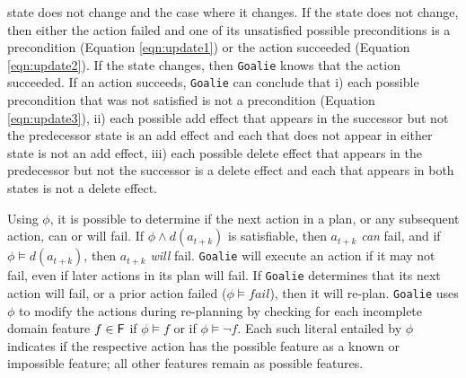 \documentclass[letterpaper]{article}
\def\FFRISKY{{\tt DeFAULT}}
\def\goalie{{\tt Goalie}}
\begin{document}
state does not change and the case where it changes.  If the state does not
change, then either the action failed and one of its unsatisfied possible
preconditions is a precondition (Equation \ref{eqn:update1}) or the action
succeeded (Equation \ref{eqn:update2}).  If the state changes, then \goalie{}
knows that the action succeeded.  If an action succeeds, \goalie{} can conclude
that i) each possible precondition that was not satisfied is not a precondition
(Equation \ref{eqn:update3}), ii) each possible add effect that appears in the
successor but not the predecessor state is an add effect and each that does not
appear in either state is not an add effect, iii) each possible delete effect
that appears in the predecessor but not the successor is a delete effect and
each that  appears in both states is not a delete effect.

Using $\phi$, it is possible to determine if the next action in a plan, or any
subsequent action, can or will fail.  If  $\phi \wedge d(a_{t+k})$ is
satisfiable, then $a_{t+k}$ {\em can} fail, and if $\phi \models d(a_{t+k})$,
then $a_{t+k}$ {\em will}  fail.  \goalie{} will execute an action if it may not
fail, even if later actions in its plan will fail.  If \goalie{} determines that
its next action will fail, or a prior action failed ($\phi \models fail$), then
it will re-plan.  \goalie{}  uses $\phi$ to modify the actions during
re-planning by checking for each incomplete domain feature $f \in {\sf
F}$ if $\phi \models f$ or if $\phi \models \neg f$.  Each such
literal entailed by $\phi$ indicates if the respective action has the possible
feature as a known or impossible feature; all other features remain as possible
features.


\end{document}
